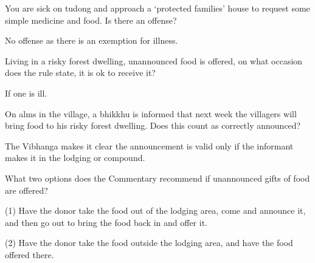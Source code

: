 
You are sick on tudong and approach a ‘protected families’ house to request some
simple medicine and food. Is there an offense?

\bigskip

\begin{solution}
  No offense as there is an exemption for illness.
\end{solution}


Living in a risky forest dwelling, unannounced food is offered, on what occasion
does the rule state, it is ok to receive it?

\begin{solution}
  If one is ill.
\end{solution}

\bigskip

On alms in the village, a bhikkhu is informed that next week the villagers will
bring food to his risky forest dwelling. Does this count as correctly announced?

\begin{solution}
  The Vibhanga makes it clear the announcement is valid only if the informant
  makes it in the lodging or compound.
\end{solution}

\bigskip

What two options does the Commentary recommend if unannounced gifts of food are offered?

\begin{solution}
  (1) Have the donor take the food out of the lodging area, come and announce it,
  and then go out to bring the food back in and offer it.
 
  (2) Have the donor take the food outside the lodging area, and have the food
  offered there.
\end{solution}

